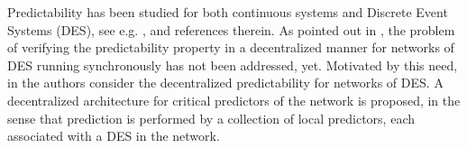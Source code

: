 \documentclass[letterpaper, 10 pt, conference]{ieeeconf}
\begin{document}
Predictability has been studied for both continuous systems and Discrete Event Systems (DES), see e.g. \cite{Laf:2009}, and references therein.
%
As pointed out in \cite{YIN2017199}, the problem of verifying the predictability property in a decentralized manner for networks of DES running synchronously has not been addressed, yet. Motivated by this need, in \cite{LCSS18}
 the authors consider the decentralized predictability for networks of DES. 
 A decentralized architecture for critical predictors of the network is proposed, in the sense that prediction is performed by a collection of local predictors, each associated with a DES in the network. 
\end{document}
